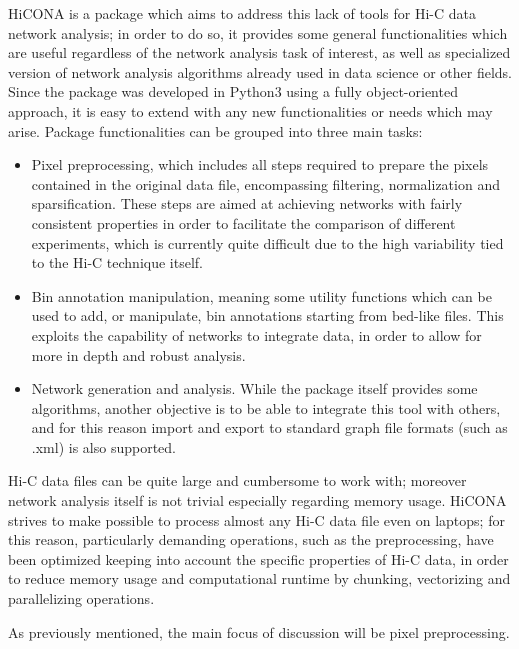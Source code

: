 HiCONA is a package which aims to address this lack of tools for Hi-C data network analysis; in order to do so, it provides some general functionalities which are useful regardless of the network analysis task of interest, as well as specialized version of network analysis algorithms already used in data science or other fields. Since the package was developed in Python3 using a fully object-oriented approach, it is easy to extend with any new functionalities or needs which may arise. Package functionalities can be grouped into three main tasks:
\begin{itemize}\tightlist
  \item Pixel preprocessing, which includes all steps required to prepare the pixels contained in the original data file, encompassing filtering, normalization and sparsification. These steps are aimed at achieving networks with fairly consistent properties in order to facilitate the comparison of different experiments, which is currently quite difficult due to the high variability tied to the Hi-C technique itself.
  \item Bin annotation manipulation, meaning some utility functions which can be used to add, or manipulate, bin annotations starting from bed-like files. This exploits the capability of networks to integrate data, in order to allow for more in depth and robust analysis. 
  \item Network generation and analysis. While the package itself provides some algorithms, another objective is to be able to integrate this tool with others, and for this reason import and export to standard graph file formats (such as .xml) is also supported.  
\end{itemize}

Hi-C data files can be quite large and cumbersome to work with; moreover network analysis itself is not trivial especially regarding memory usage. HiCONA strives to make possible to process almost any Hi-C data file even on laptops; for this reason, particularly demanding operations, such as the preprocessing, have been optimized keeping into account the specific properties of Hi-C data, in order to reduce memory usage and computational runtime by chunking, vectorizing and parallelizing operations.

As previously mentioned, the main focus of discussion will be pixel preprocessing.


